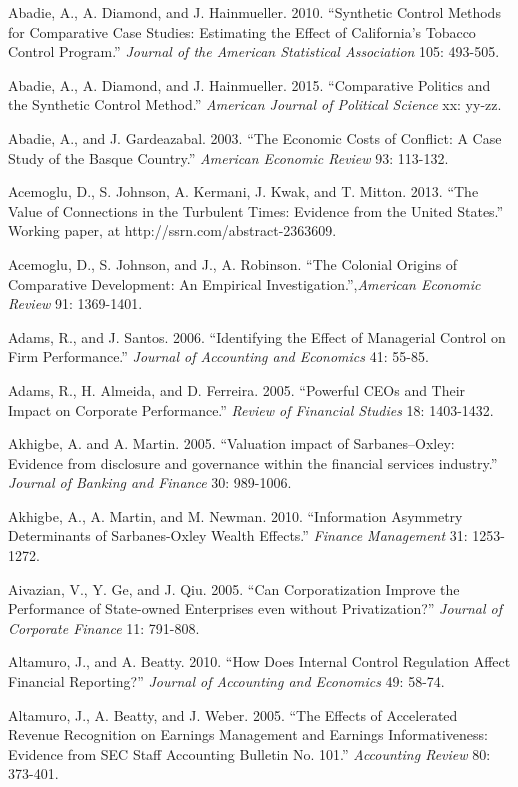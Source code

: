 \noindent Abadie, A., A. Diamond, and J. Hainmueller. 2010. ``Synthetic Control Methods for Comparative Case Studies:  Estimating the Effect of California's Tobacco Control Program.'' \textit{Journal of the American Statistical Association} 105: 493-505.

\noindent Abadie, A., A. Diamond, and J. Hainmueller. 2015. ``Comparative Politics and the Synthetic Control Method.'' \textit{American Journal of Political Science} xx: yy-zz.

\noindent Abadie, A., and J. Gardeazabal. 2003.  ``The Economic Costs of Conflict:  A Case Study of the Basque Country.'' \textit{American Economic Review} 93: 113-132.

\noindent Acemoglu, D., S. Johnson, A. Kermani, J. Kwak, and T. Mitton.  2013.  ``The Value of Connections in the Turbulent Times:  Evidence from the United States.''  Working paper, at http://ssrn.com/abstract-2363609. 

\noindent Acemoglu, D., S. Johnson, and J., A. Robinson. ``The Colonial Origins of Comparative Development:  An Empirical Investigation.'',\textit{American Economic Review }91: 1369-1401.

\noindent Adams, R., and J. Santos. 2006. ``Identifying the Effect of Managerial Control on Firm Performance.''  \textit{Journal of Accounting and Economics }41: 55-85.

\noindent Adams, R., H. Almeida, and D. Ferreira. 2005. ``Powerful CEOs and Their Impact on Corporate Performance.''  \textit{Review of Financial Studies} 18: 1403-1432.

\noindent Akhigbe, A. and A. Martin. 2005. ``Valuation impact of Sarbanes--Oxley: Evidence from disclosure and governance within the financial services industry.'' \textit{Journal of Banking and Finance} 30: 989-1006.

\noindent Akhigbe, A., A. Martin, and M. Newman. 2010. ``Information Asymmetry Determinants of Sarbanes-Oxley Wealth Effects.'' \textit{Finance Management} 31: 1253-1272.

\noindent Aivazian, V., Y. Ge, and J. Qiu. 2005. ``Can Corporatization Improve the Performance of State-owned Enterprises even without Privatization?'' \textit{Journal of Corporate Finance} 11: 791-808.

\noindent Altamuro, J., and A. Beatty. 2010. ``How Does Internal Control Regulation Affect Financial Reporting?'' \textit{Journal of Accounting and Economics }49: 58-74.

\noindent Altamuro, J., A. Beatty, and J. Weber. 2005. ``The Effects of Accelerated Revenue Recognition on Earnings Management and Earnings Informativeness: Evidence from SEC Staff Accounting Bulletin No. 101.''  \textit{Accounting Review} 80: 373-401.

